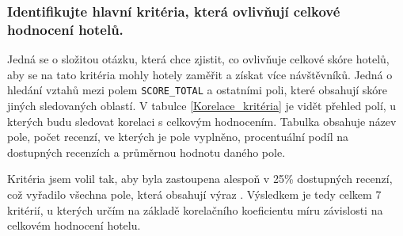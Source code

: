 \documentclass[czech,BP]{thesiskiv}
\begin{document}
\subsubsection{Identifikujte hlavní kritéria, která ovlivňují celkové hodnocení hotelů.}
\label{subsub:kriteria}
Jedná se o složitou otázku, která chce zjistit, co ovlivňuje celkové skóre hotelů, aby se na tato kritéria mohly hotely zaměřit a získat více návštěvníků. Jedná o hledání vztahů mezi polem \texttt{SCORE\_TOTAL} a ostatními poli, které obsahují skóre jiných sledovaných oblastí. V tabulce \ref{Korelace_kritéria} je vidět přehled polí, u kterých budu sledovat korelaci s celkovým hodnocením. Tabulka obsahuje název pole, počet recenzí, ve kterých je pole vyplněno, procentuální podíl na dostupných recenzích a průměrnou hodnotu daného pole. 


Kritéria jsem volil tak, aby byla zastoupena alespoň v 25\% dostupných recenzí, což vyřadilo všechna pole, která obsahují výraz . Výsledkem je tedy celkem 7 kritérií, u kterých určím na základě korelačního koeficientu míru závislosti na celkovém hodnocení hotelu.
\end{document}
